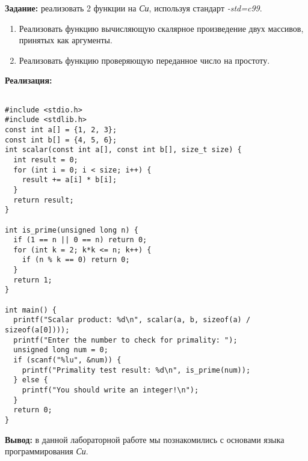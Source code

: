 \documentclass[12pt, a4paper]{article}
\begin{document}


\textbf{Задание:} реализовать 2 функции на \textit{Си}, используя стандарт
\textit{-std=c99}.
\begin{enumerate}
\item Реализовать функцию вычисляющую скалярное произведение двух
массивов, принятых как аргументы.
\item Реализовать функцию проверяющую переданное число на простоту.
\end{enumerate}

\textbf{Реализация:}
\begin{lstlisting}

#include <stdio.h>
#include <stdlib.h>
const int a[] = {1, 2, 3};
const int b[] = {4, 5, 6};
int scalar(const int a[], const int b[], size_t size) {
  int result = 0;
  for (int i = 0; i < size; i++) {
    result += a[i] * b[i];
  }
  return result;
}

int is_prime(unsigned long n) {
  if (1 == n || 0 == n) return 0;
  for (int k = 2; k*k <= n; k++) {
    if (n % k == 0) return 0;
  }
  return 1;
}

int main() {
  printf("Scalar product: %d\n", scalar(a, b, sizeof(a) / sizeof(a[0])));
  printf("Enter the number to check for primality: ");
  unsigned long num = 0;
  if (scanf("%lu", &num)) {
    printf("Primality test result: %d\n", is_prime(num));
  } else {
    printf("You should write an integer!\n");
  }
  return 0;
}

\end{lstlisting}

\textbf{Вывод:} в данной лабораторной работе мы познакомились с основами
языка программирования \textit{Си}.
\end{document}
